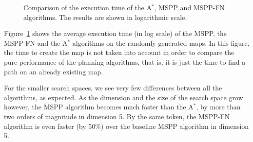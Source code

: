 \documentclass[letterpaper, 10 pt, conference]{ieeeconf}
\theoremstyle{definition}
\begin{document}
\begin{figure}[ht]
\centering
{} \caption{Comparison of the execution time of the A$^*$, MSPP and MSPP-FN algorithms. The results are shown in logarithmic scale.}
\label{comparison}
\end{figure}

Figure~\ref{comparison} shows the average execution time (in log scale) of the MSPP, the MSPP-FN and the A$^*$ algorithms on the randomly generated maps.
In this figure, the time to create the map is not taken into account in order to compare the pure performance of the planning algorithms, that is, it is just the time to find a path on an already existing map.

For the smaller search spaces, we see very few differences between all the algorithms, as expected.
As the dimension and the size of the search space grow however, the MSPP algorithm becomes much faster than the A$^*$, by more than two orders of magnitude in dimension 5. By the same token,
the MSPP-FN algorithm is even faster (by 50\%) over the baseline MSPP algorithm in dimension 5.
\end{document}
